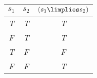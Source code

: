 
\begin{center}
\begin{tabular}{c c||c}
$s_1$  & $s_2$ & $(s_1 \limplies s_2)$\\
\hline
\emph{T} & \emph{T} & \emph{T} \\
\emph{F} & \emph{T} & \emph{T} \\
\emph{T} & \emph{F} & \emph{F}  \\
\emph{F} & \emph{F} & \emph{T} \\
\end{tabular}
\end{center}

